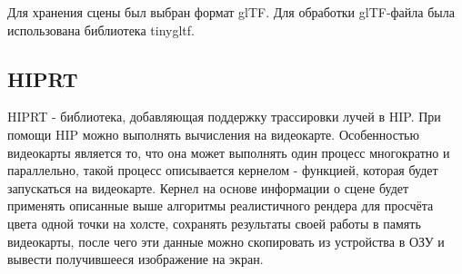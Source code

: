 \documentclass[a4paper,14pt]{extarticle}
\begin{document}
Для хранения сцены был выбран формат glTF. Для обработки glTF-файла была использована библиотека tinygltf. 
\subsection{HIPRT}
HIPRT - библиотека, добавляющая поддержку трассировки лучей в HIP. 
При помощи HIP можно выполнять вычисления на видеокарте.
Особенностью видеокарты является то, что она может выполнять один процесс многократно и параллельно, 
такой процесс описывается кернелом - функцией, которая будет запускаться на видеокарте. Кернел на основе информации о сцене 
будет применять описанные выше алгоритмы реалистичного рендера для просчёта цвета одной точки на холсте, 
сохранять результаты своей работы в память видеокарты, после чего эти данные можно скопировать из устройства в ОЗУ 
и вывести получившееся изображение на экран.
\end{document}
